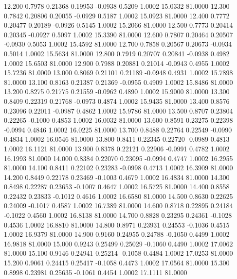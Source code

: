   12.200   0.7978   0.21368   0.19953  -0.0938   0.5209   1.0002  15.0332  81.0000
  12.300   0.7842   0.20806   0.20055  -0.0929   0.5187   1.0002  15.0923  81.0000
  12.400   0.7772   0.20477   0.20189  -0.0926   0.5145   1.0002  15.2066  81.0000
  12.500   0.7773   0.20414   0.20345  -0.0927   0.5097   1.0002  15.3390  81.0000
  12.600   0.7807   0.20464   0.20507  -0.0930   0.5053   1.0002  15.4592  81.0000
  12.700   0.7858   0.20567   0.20673  -0.0934   0.5014   1.0002  15.5634  81.0000
  12.800   0.7919   0.20707   0.20841  -0.0938   0.4982   1.0002  15.6503  81.0000
  12.900   0.7988   0.20881   0.21014  -0.0943   0.4955   1.0002  15.7236  81.0000
  13.000   0.8069   0.21101   0.21189  -0.0948   0.4931   1.0002  15.7898  81.0000
  13.100   0.8163   0.21387   0.21369  -0.0955   0.4909   1.0002  15.8486  81.0000
  13.200   0.8275   0.21775   0.21559  -0.0962   0.4890   1.0002  15.9000  81.0000
  13.300   0.8409   0.22319   0.21768  -0.0973   0.4874   1.0002  15.9435  81.0000
  13.400   0.8576   0.23096   0.22011  -0.0987   0.4862   1.0002  15.9786  81.0000
  13.500   0.8707   0.23804   0.22265  -0.1000   0.4853   1.0002  16.0032  81.0000
  13.600   0.8591   0.23275   0.22398  -0.0994   0.4846   1.0002  16.0225  81.0000
  13.700   0.8488   0.22764   0.22549  -0.0990   0.4834   1.0002  16.0546  81.0000
  13.800   0.8411   0.22345   0.22720  -0.0989   0.4813   1.0002  16.1121  81.0000
  13.900   0.8378   0.22121   0.22906  -0.0991   0.4782   1.0002  16.1993  81.0000
  14.000   0.8384   0.22070   0.23095  -0.0994   0.4747   1.0002  16.2955  81.0000
  14.100   0.8411   0.22102   0.23283  -0.0998   0.4713   1.0002  16.3909  81.0000
  14.200   0.8449   0.22178   0.23469  -0.1003   0.4679   1.0002  16.4834  81.0000
  14.300   0.8498   0.22287   0.23653  -0.1007   0.4647   1.0002  16.5725  81.0000
  14.400   0.8558   0.22432   0.23833  -0.1012   0.4616   1.0002  16.6580  81.0000
  14.500   0.8630   0.22625   0.24009  -0.1017   0.4587   1.0002  16.7389  81.0000
  14.600   0.8718   0.22895   0.24184  -0.1022   0.4560   1.0002  16.8138  81.0000
  14.700   0.8828   0.23295   0.24361  -0.1028   0.4536   1.0002  16.8810  81.0000
  14.800   0.8971   0.23931   0.24553  -0.1036   0.4515   1.0002  16.9379  81.0000
  14.900   0.9160   0.24955   0.24788  -0.1050   0.4499   1.0002  16.9818  81.0000
  15.000   0.9243   0.25499   0.25029  -0.1060   0.4490   1.0002  17.0062  81.0000
  15.100   0.9146   0.24941   0.25214  -0.1058   0.4484   1.0002  17.0253  81.0000
  15.200   0.9061   0.24415   0.25417  -0.1058   0.4473   1.0002  17.0564  81.0000
  15.300   0.8998   0.23981   0.25635  -0.1061   0.4454   1.0002  17.1111  81.0000

